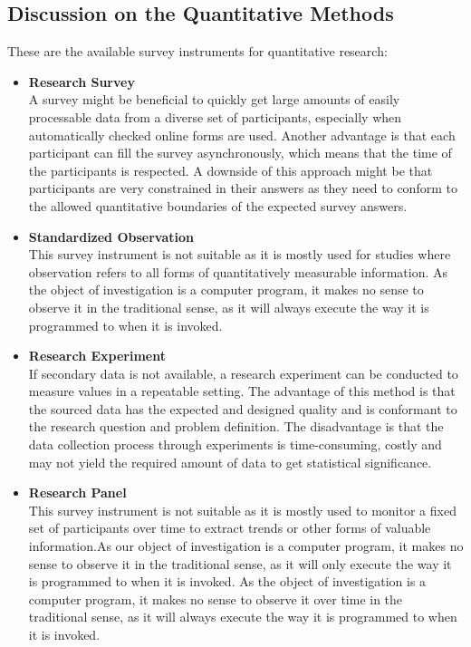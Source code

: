 \documentclass[draft,final]{thesisclass} %
\begin{document}
\subsection{Discussion on the Quantitative Methods}
These are the available survey instruments for quantitative research:
\begin{itemize}
    \item \textbf{Research Survey}\\
    A survey might be beneficial to quickly get large amounts of easily processable data from a diverse set of participants, especially when automatically checked online forms are used.
    Another advantage is that each participant can fill the survey asynchronously, which means that the time of the participants is respected.
    A downside of this approach might be that participants are very constrained in their answers as they need to conform to the allowed quantitative boundaries of the expected survey answers.
    \item \textbf{Standardized Observation}\\
    This survey instrument is not suitable as it is mostly used for studies where observation refers to all forms of quantitatively measurable information.
    As the object of investigation is a computer program, it makes no sense to observe it in the traditional sense, as it will always execute the way it is programmed to when it is invoked.
    \item \textbf{Research Experiment}\\
    If secondary data is not available, a research experiment can be conducted to measure values in a repeatable setting.
    The advantage of this method is that the sourced data has the expected and designed quality and is conformant to the research question and problem definition.
    The disadvantage is that the data collection process through experiments is time-consuming, costly and may not yield the required amount of data to get statistical significance.
    \item \textbf{Research Panel}\\
    This survey instrument is not suitable as it is mostly used to monitor a fixed set of participants over time to extract trends or other forms of valuable information.As our object of investigation is a computer program, it makes no sense to observe it in the traditional sense, as it will only execute the way it is programmed to when it is invoked.
    As the object of investigation is a computer program, it makes no sense to observe it over time in the traditional sense, as it will always execute the way it is programmed to when it is invoked.

\end{itemize}
\end{document}
